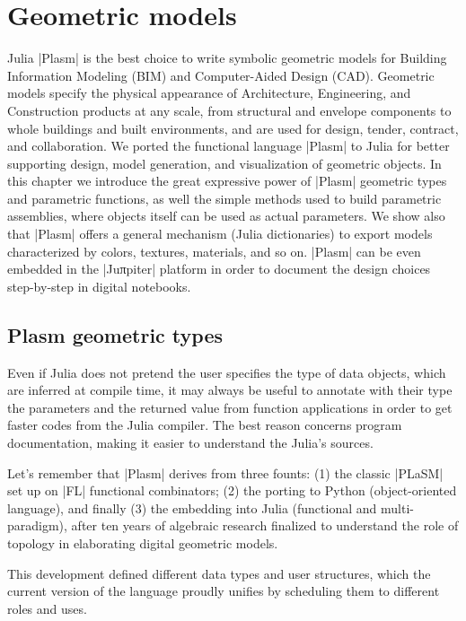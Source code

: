 
\chapter{Geometric models}
\label{chapt:4}

Julia |Plasm| is the best choice to write symbolic geometric models for Building Information Modeling (BIM) and Computer-Aided Design (CAD).  Geometric models specify the physical appearance of Architecture, Engineering, and Construction products at any scale, from structural and envelope components to whole buildings and built environments, and are used for design, tender, contract, and collaboration. We ported the  functional language |Plasm| to Julia for better supporting design, model generation, and visualization of geometric objects.
In this chapter we introduce the great expressive power of |Plasm| geometric types and parametric functions, as well the simple methods used to build parametric assemblies, where objects itself can be used as actual parameters. We show also that |Plasm| offers a  general mechanism (Julia dictionaries) to export models characterized by colors, textures, materials, and so on. |Plasm| can be even embedded in the |Juπpiter| platform in order to document the design choices step-by-step in digital notebooks.

\section{Plasm geometric types}\label{sect:4-1}

Even if Julia does not pretend the user specifies the type of data objects, which are inferred at compile time, it may always be useful to annotate with their type the parameters and the returned value from function applications in order to get faster codes from the Julia compiler. The best reason concerns program documentation, making it easier to understand the Julia's sources.

Let's remember that |Plasm| derives from three founts: (1) the classic |PLaSM| set up on |FL| functional combinators; (2) the porting to Python (object-oriented language), and finally (3) the embedding into Julia (functional and multi-paradigm), after ten years of algebraic research finalized to understand the role of topology in elaborating digital  geometric models. 

This development defined different data types and user structures, which the current version of the language proudly unifies by scheduling them to different roles and uses.
 

